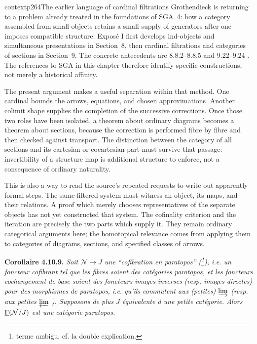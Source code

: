 
\begin{dcomment}{context}{p264}{The earlier language of cardinal filtrations}
Grothendieck is returning to a problem already treated in the foundations of SGA~4: how a category assembled from small objects retains a small supply of generators after one imposes compatible structure. Expos\'e I first develops ind-objects and simultaneous presentations in Section~8, then cardinal filtrations and categories of sections in Section~9. The concrete antecedents are 8.8.2--8.8.5 and 9.22--9.24 \citep{SGA4I1972}. The references to SGA in this chapter therefore identify specific constructions, not merely a historical affinity.

The present argument makes a useful separation within that method. One cardinal bounds the arrows, equations, and chosen approximations. Another colimit shape supplies the completion of the successive corrections. Once those two roles have been isolated, a theorem about ordinary diagrams becomes a theorem about sections, because the correction is performed fibre by fibre and then checked against transport. The distinction between the category of all sections and its cartesian or cocartesian part must survive that passage: invertibility of a structure map is additional structure to enforce, not a consequence of ordinary naturality.

This is also a way to read the source's repeated requests to write out apparently formal steps. The same filtered system must witness an object, its maps, and their relations. A proof which merely chooses representatives of the separate objects has not yet constructed that system. The cofinality criterion and the iteration are precisely the two parts which supply it. They remain ordinary categorical arguments here; the homotopical relevance comes from applying them to categories of diagrams, sections, and specified classes of arrows.
\end{dcomment}


\textbf{Corollaire 4.10.9.} \textit{Soit $\mathcal{N} \longrightarrow J$ une “cofibration en paratopos” (\footnote{terme ambigu, cf. la double explication.}), i.e. un foncteur cofibrant tel que les fibres soient des catégories paratopos, et les foncteurs cochangement de base soient des foncteurs images inverses (resp. images directes) pour des morphismes de paratopos, i.e. qu'ils commutent aux (petites) $\varinjlim$ (resp. aux petites $\varprojlim$ ). Supposons de plus $J$ équivalente à une petite catégorie. Alors $\underline{\Gamma}(\mathcal{N}/J)$ est une catégorie paratopos.}

